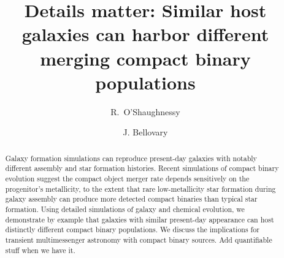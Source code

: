 \documentclass[nofootinbib,twocolumn,prd]{emulateapj}
\newcommand\jillianremark[1]{{\color{blue}#1}}
\begin{document}
\title{Details matter: Similar host galaxies can harbor different merging compact binary populations} 
\author{R.\ O'Shaughnessy}
\author{ J. Bellovary}
\begin{abstract}
Galaxy formation
simulations can reproduce present-day galaxies with notably different assembly and star formation histories.  
Recent simulations of compact binary evolution suggest the compact object merger rate depends
sensitively on the progenitor's metallicity, to the extent that rare low-metallicity star formation during galaxy
assembly can produce more detected compact binaries than typical star formation.   
Using detailed simulations of galaxy and chemical evolution, we demonstrate by example that galaxies with similar present-day appearance can host distinctly different
compact binary populations.
We discuss the implications for transient multimessenger astronomy with compact binary sources. \jillianremark{Add quantifiable stuff when we have it.}

\end{abstract}
\end{document}
